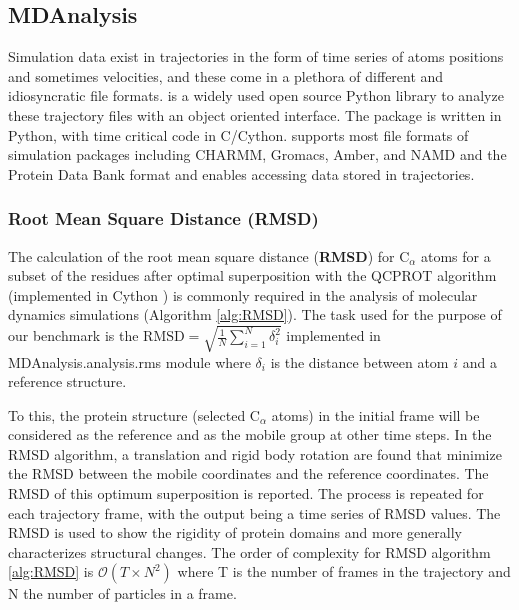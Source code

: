 \label{use_cases}

\subsection{MDAnalysis}
\label{sec:mda}

Simulation data exist in trajectories in the form of time series of atoms positions and sometimes velocities, and these come in a plethora of different and idiosyncratic file formats. 
 \citep{Gowers:2016aa,Michaud-Agrawal:2011fu} is a widely used open source Python library to analyze these trajectory files with an object oriented interface. 
The package is written in Python, with time critical code in C/Cython. 
 supports most file formats of simulation packages including CHARMM, Gromacs, Amber, and NAMD and the Protein Data Bank format and enables accessing data stored in trajectories. 
 
\subsubsection{Root Mean Square Distance (RMSD)}
The calculation of the root mean square distance (\textbf{RMSD}) for C$_{\alpha}$ atoms for a subset of the residues after 
optimal superposition with the QCPROT algorithm \cite{Liu:2010kx,Theobald:2005vn} (implemented in Cython \cite{Gowers:2016aa}) is commonly required in the analysis of molecular dynamics simulations (Algorithm \ref{alg:RMSD}). 
The task used for the purpose of our benchmark is the $\text{RMSD}=\sqrt{\frac{1}{N}\sum_{i=1}^{N}\delta_{i}^{2}}$ implemented in MDAnalysis.analysis.rms module where $\delta_{i}$ is the distance between atom $i$ and a reference structure.  

To this, the protein structure (selected C$_{\alpha}$ atoms) in the initial frame will be considered as the reference and as the mobile group at other time steps. 
In the RMSD algorithm, a translation and rigid body rotation are found that minimize the RMSD between the mobile coordinates and the reference coordinates. 
The RMSD of this optimum superposition is reported. 
The process is repeated for each trajectory frame, with the output being a time series of RMSD values.
The RMSD is used to show the rigidity of protein domains and more generally characterizes structural changes.
The order of complexity for RMSD algorithm \ref{alg:RMSD} is $\mathcal{O}(T \times N^{2})$ \cite{Liu:2010kx} where T is the number of frames in the trajectory and N the number of particles in a frame.

